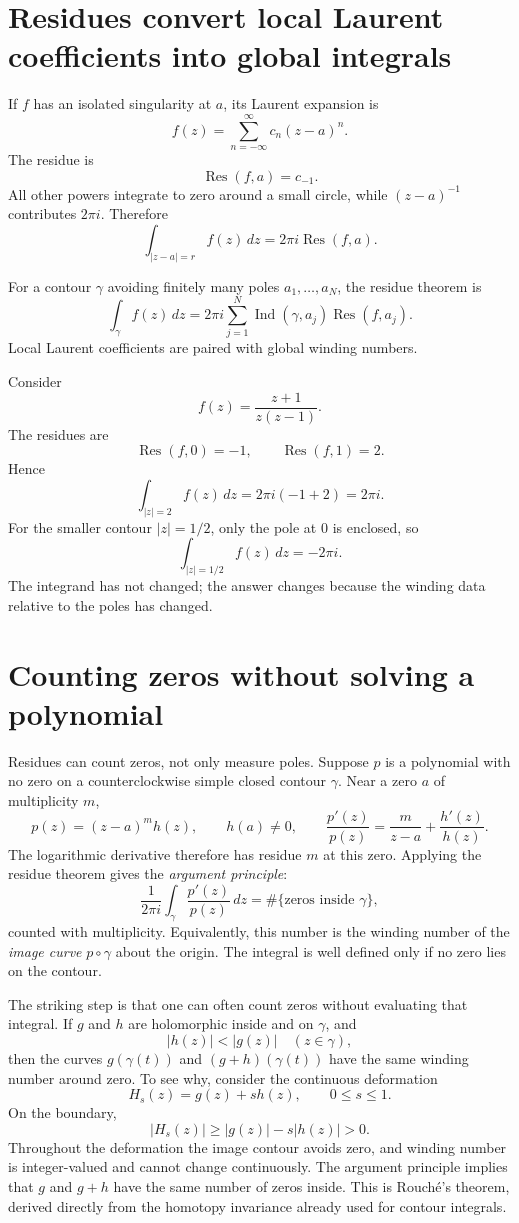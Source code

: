 \section{Residues convert local Laurent coefficients into global integrals}

If \(f\) has an isolated singularity at \(a\), its Laurent expansion is
\[
  f(z)=\sum_{n=-\infty}^{\infty}c_n(z-a)^n.
\]
The residue is
\[
  \operatorname{Res}(f,a)=c_{-1}.
\]
All other powers integrate to zero around a small circle, while \((z-a)^{-1}\) contributes \(2\pi i\).  Therefore
\[
  \int_{|z-a|=r}f(z)\,dz
  =2\pi i\operatorname{Res}(f,a).
\]

For a contour \(\gamma\) avoiding finitely many poles \(a_1,\ldots,a_N\), the residue theorem is
\[
  \boxed{
  \int_\gamma f(z)\,dz
  =2\pi i
  \sum_{j=1}^N
  \operatorname{Ind}(\gamma,a_j)
  \operatorname{Res}(f,a_j).}
\]
Local Laurent coefficients are paired with global winding numbers.

Consider
\[
  f(z)=\frac{z+1}{z(z-1)}.
\]
The residues are
\[
  \operatorname{Res}(f,0)=-1,
  \qquad
  \operatorname{Res}(f,1)=2.
\]
Hence
\[
  \int_{|z|=2}f(z)\,dz
  =2\pi i(-1+2)=2\pi i.
\]
For the smaller contour \(|z|=1/2\), only the pole at \(0\) is enclosed, so
\[
  \int_{|z|=1/2}f(z)\,dz=-2\pi i.
\]
The integrand has not changed; the answer changes because the winding data relative to the poles has changed.

\section{Counting zeros without solving a polynomial}

Residues can count zeros, not only measure poles. Suppose $p$ is a polynomial with no zero on a counterclockwise simple closed contour $\gamma$. Near a zero $a$ of multiplicity $m$,
\[
 p(z)=(z-a)^m h(z),\qquad h(a)\ne0,
 \qquad
 \frac{p'(z)}{p(z)}=\frac{m}{z-a}+\frac{h'(z)}{h(z)}.
\]
The logarithmic derivative therefore has residue $m$ at this zero. Applying the residue theorem gives the \emph{argument principle}:
\[
 \boxed{\frac1{2\pi i}\int_\gamma\frac{p'(z)}{p(z)}\,dz
 =\#\{\text{zeros inside }\gamma\},}
\]
counted with multiplicity. Equivalently, this number is the winding number of the \emph{image curve} $p\circ\gamma$ about the origin. The integral is well defined only if no zero lies on the contour.

The striking step is that one can often count zeros without evaluating that integral. If $g$ and $h$ are holomorphic inside and on $\gamma$, and
\[
 \boxed{|h(z)|<|g(z)|\quad(z\in\gamma),}
\]
then the curves $g(\gamma(t))$ and $(g+h)(\gamma(t))$ have the same winding number around zero. To see why, consider the continuous deformation
\[
 H_s(z)=g(z)+s h(z),\qquad 0\le s\le1.
\]
On the boundary,
\[
 |H_s(z)|\ge|g(z)|-s|h(z)|>0.
\]
Throughout the deformation the image contour avoids zero, and winding number is integer-valued and cannot change continuously. The argument principle implies that $g$ and $g+h$ have the same number of zeros inside. This is Rouch\'e's theorem, derived directly from the homotopy invariance already used for contour integrals.

